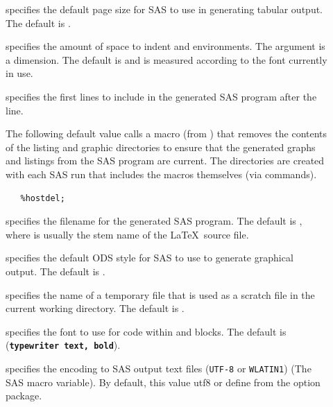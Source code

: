 \documentclass[article,oneside]{memoir}
\begin{document}
\begin{description}
    \item[] specifies the default page size for SAS to use in generating
    tabular output. The default is .


     \item[] specifies the amount of space to indent
      and  environments.
     The argument is a dimension.
     The default is \Code{3em} and is measured according to the font currently in use.

     \item[] specifies the first lines to include in the generated SAS program
     after the  line.

     The following default value calls a macro (from )
     that removes the contents of the listing and graphic directories to ensure
     that the generated graphs and listings from the SAS program are current.
     The directories are created with
     each SAS run that includes the macros themselves (via  commands).
\begin{snugshade}
\begin{verbatim}
   %hostdel;
\end{verbatim}
\end{snugshade}

      \item[] specifies the filename for the generated SAS
     program. The default is , where  is
     usually the stem name of the \LaTeX\ source file.


    \item[] specifies the default ODS style for SAS to use to generate
    graphical output. The default is .

     \item[] specifies the name of a temporary file
     that is used as a scratch file in the current working directory.
     The default is .

     \item[] specifies the font to use for code within  and
      blocks. The default is 
     (\texttt{\textbf{typewriter text, bold}}).  
   
    
     \item[] specifies the encoding to SAS output text files (\texttt{UTF-8} or \texttt{WLATIN1}) (The  SAS macro variable). By default, this value utf8 or define from the option package.

     \end{description}
\end{document}
